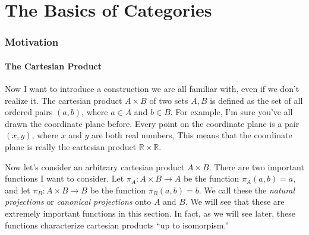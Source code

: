 \part{The Basics of Categories}
\section{Motivation}

\subsection{The Cartesian Product}

Now I want to introduce a construction we are all familiar with, even if we don't realize it. The cartesian product $A\times B$ of two sets $A,B$ is defined as the set of all ordered pairs $(a,b)$, where $a\in A$ and $b\in B$. For example, I'm sure you've all drawn the coordinate plane before. Every point on the coordinate plane is a pair $(x,y)$, where $x$ and $y$ are both real numbers, This means that the coordinate plane is really the cartesian product $\mathbb{R} \times \mathbb{R} $.

Now let's consider an arbitrary cartesian product $A\times B$. There are two important functions I want to consider. Let $\pi _A : A\times B \to A$ be the function $\pi_A(a,b)=a$, and let $\pi _B : A\times B \to B$ be the function $\pi _B(a,b)=b$. We call these the \emph{natural projections} or \emph{canonical projections} onto $A$ and $B$. We will see that these are extremely important functions in this section. In fact, as we will see later, these functions characterize cartesian products ``up to isomorpism.''

